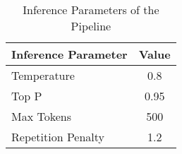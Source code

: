 
\begin{table}[ht]
    \centering
    \begin{tabular}{>{\raggedright\arraybackslash}p{5cm}c}
        \toprule
        \textbf{Inference Parameter} & \textbf{Value} \\
        \midrule
        Temperature & 0.8 \\
        Top P & 0.95 \\
        Max Tokens & 500 \\
        Repetition Penalty & 1.2 \\
        \bottomrule
    \end{tabular}
    \caption{Inference Parameters of the \RedTeaming{} Pipeline}
    \label{tab:safety_rt_inference_parameters}
\end{table}
